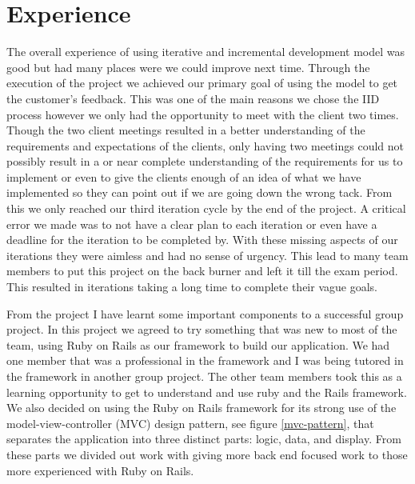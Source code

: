 \documentclass{style/CRPITStyle}
\begin{document}
\section{Experience}

The overall experience of using iterative and incremental development model was
good but had many places were we could improve next time. Through the
execution of the project we achieved our primary goal of using the model to get
the customer's feedback. This was one of the main reasons we chose the IID
process however we only had the opportunity to meet with the client two times.
Though the two client meetings resulted in a better understanding of the
requirements and expectations of the clients, only having two meetings
could not possibly result in a or near complete understanding of the
requirements for us to implement or even to give the clients enough of an idea of
what we have implemented so they can point out if we are going down the wrong
tack.
From this we only reached our third iteration cycle by the end of the project.
A critical error we made was to not have a clear plan to each iteration or even
have a deadline for the iteration to be completed by. With these missing aspects
of our iterations they were aimless and had no sense of urgency. This lead to
many team members to put this project on the back burner and left it till the
exam period. This resulted in iterations taking a long time to complete their
vague goals.

\vspace{.1in}

From the project I have learnt some important components to a successful group
project. In this project we agreed to try something that was new to most of the
team, using Ruby on Rails as our framework to build our application. We had one
member that was a professional in the framework and I was being tutored in the
framework in another group project. The other team members took this as a
learning opportunity to get to understand and use ruby and the Rails framework.
We also decided on using the Ruby on Rails framework for its strong use of the
model-view-controller (MVC) design pattern, see figure \ref{mvc-pattern}, that
separates the application into three distinct parts: logic, data, and display.
From these parts we divided out work with giving more back end focused work to
those more experienced with Ruby on Rails.
\end{document}
